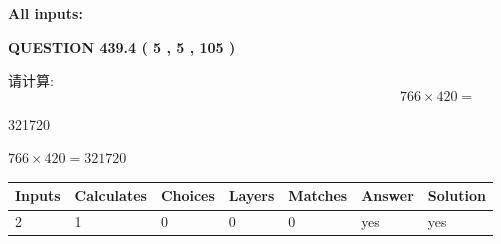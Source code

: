 \documentclass{ctexart}
\begin{document}
   
   
   
\noindent{}
   
   
   
   
\noindent\vspace{0.1in}\hspace{-0.08in} {\textbf{\Large{All inputs: }}}
   
   
  
\vspace{0.2in}
  
{\textbf{\Large{QUESTION
439.4 
 ( 5 , 5 , 105 )
}}}
  
  
 
请计算:
\begin{equation}
766  \times    %
420 = \nonumber
\end{equation}
 
 
 
\noindent{}
 
 

321720
 
 
\noindent{}
 
 

 
 
 
\noindent{}
 
 

$ %
766 \times  %
420=   %
321720$
 
 
\noindent{}
 
 

 
   
   
   
   
\noindent\begin{tabular}{|l|l|l|l|l|l|l|}
 \hline
Inputs & Calculates & Choices & Layers & Matches & Answer & Solution \\ \hline
 2  & 
 1  & 
 0
  & 
 0  & 
 0  & 
  yes & 
  yes 
  \\ \hline
 \end{tabular}
   
   
   
   
\noindent{}
   
\end{document}
